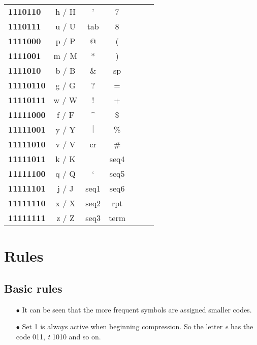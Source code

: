 \documentclass[]{article}
\begin{document}
\begin{center}
\begin{tabular}{ | l | c | c | c | c | c | c | }
			\textbf{1110110} & h / H & ' & 7 & & \\ \cline{1-4}
			\textbf{1110111} & u / U & tab & 8 & & \\ \cline{1-4}
			\textbf{1111000} & p / P & @ & ( & & \\ \cline{1-4}
			\textbf{1111001} & m / M & * & ) & & \\ \cline{1-4}
			\textbf{1111010} & b / B & \& & sp & & \\ \cline{1-4}
			\textbf{11110110} & g / G & ? & = & & \\ \cline{1-4}
			\textbf{11110111} & w / W & ! & + & & \\ \cline{1-4}
			\textbf{11111000} & f / F & \^{} & \$ & & \\ \cline{1-4}
			\textbf{11111001} & y / Y & $|$ & \% & & \\ \cline{1-4}
			\textbf{11111010} & v / V & cr & \# & & \\ \cline{1-4}
			\textbf{11111011} & k / K & ~ & seq4 & & \\ \cline{1-4}
			\textbf{11111100} & q / Q & ` & seq5 & & \\ \cline{1-4}
			\textbf{11111101} & j / J & seq1 & seq6 & & \\ \cline{1-4}
			\textbf{11111110} & x / X & seq2 & rpt & & \\ \cline{1-4}
			\textbf{11111111} & z / Z & seq3 & term & & \\ \hline
		\end{tabular}
	\end{center}
	
	\section{Rules}
	
	\subsection{Basic rules}
	\begin{itemize}
		\item[$\bullet$] It can be seen that the more frequent symbols are assigned smaller codes.
		\item[$\bullet$] Set 1 is always active when beginning compression. So the letter \emph{e} has the code 011, \emph{t} 1010 and so on.
	\end{itemize}
	
\end{document}
